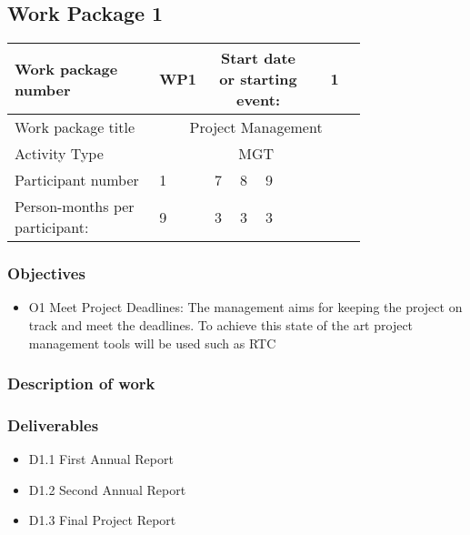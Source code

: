 \subsection{Work Package 1}

\begin{table}[hbpt]\centering
	\begin{tabular}{|p{0.35\linewidth}|p{0.06\linewidth}|p{0.06\linewidth}|p{0.06\linewidth}|
                     p{0.06\linewidth}|p{0.06\linewidth}|p{0.06\linewidth}|p{0.06\linewidth}|}\hline
		 Work package number& WP1 &
		 \multicolumn{4}{|c|}{Start date or starting event:}{}&
		 \multicolumn{2}{|c|}{                        1  }{}\\\hline
		 Work package title&\multicolumn{7}{|c|}{ Project Management }{}\\\hline
		 Activity Type&\multicolumn{7}{|c|}{ MGT }{}\\\hline
		 Participant number & 1 & 7 & 8 & 9 & ~ & ~ & ~ \\\hline
		 Person-months per participant: & 9 & 3 & 3 & 3 & ~ & ~ & ~ \\\hline
	\end{tabular}
\end{table}

\subsubsection{Objectives}
\begin{itemize}
	\item O1 Meet Project Deadlines: The management aims for keeping the project on track and meet the deadlines. To achieve this state of the art project management tools will be used such as \gls{RTC}  
\end{itemize}

\subsubsection{Description of work}
  

\subsubsection{Deliverables}

\begin{itemize}
	\item D1.1 First Annual Report
	\item D1.2 Second Annual Report
	\item D1.3 Final Project Report
\end{itemize}